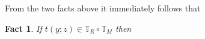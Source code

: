 \documentclass[12pt,letterpaper,oneside,reqno]{amsart}
\theoremstyle{plain}
\newtheorem{fact}[theorem]{Fact}
\theoremstyle{remark}
\begin{document}
From the two facts above it immediately follows that

\begin{fact}\label{fact_termini2}
  If $t(y;z)\in \mathds{T}_R\circ\mathds{T}_M$ then 
  
  \hfill\qedsymbol
\end{fact}

  










  

  
  


 
\end{document}
